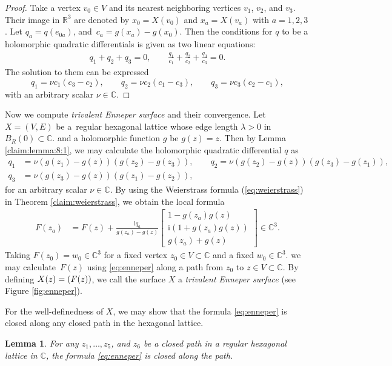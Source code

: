 \documentclass[pdftex]{sigma}
\newcommand{\R}{\mathbb{R}}
\newcommand{\C}{\mathbb{C}}
\newcommand{\ii}{{\mathrm{i}}}
\let\Re\relax
\DeclareMathOperator{\Re}{Re}
\let\Re\relax
\DeclareMathOperator{\Re}{{\mathrm Re}}
\newcommand{\1}{{\bf 1}}
\numberwithin{equation}{section}
\newtheorem{Lemma}[Theorem]{Lemma}
\begin{document}
\begin{proof}
 Take a vertex $v_0 \in V$ and its nearest neighboring vertices $v_1$, $v_2$, and $v_3$.
 Their image in $\R^3$ are denoted by $x_0 =X(v_0)$ and $x_a =X(v_a)$ with $a=1,2,3$.
 Let $q_a= q(e_{0a})$, and~${c_a= g(x_a)-g(x_0)}$.
 Then the conditions for $q$ to be a holomorphic quadratic differentials is given as two linear equations:
 \begin{gather*}
 q_1+q_2+q_3=0,\qquad
 \frac{q_1}{c_1} + \frac{q_2}{c_2} + \frac{q_3}{c_3}=0.
 \end{gather*}
 The solution to them can be expressed
 \[%
 q_1= \nu c_1(c_3-c_2),
 \qquad
 q_2= \nu c_2(c_1-c_3),
 \qquad
 q_3= \nu c_3(c_2-c_1),
 \]
 with an arbitrary scalar $\nu \in \C$.
\end{proof}

Now we compute {\em trivalent Enneper surface} and their convergence.
Let $X = (V, E)$ be a~regular hexagonal lattice whose edge length $\lambda > 0$ in $B_R(0) \subset \C$.
and a holomorphic function $g$ be $g(z) = z$.
Then by Lemma \ref{claim:lemma:8:1}, we may calculate the holomorphic quadratic differential $q$ as
 \begin{align}
 q_1 &= \nu (g(z_1) - g(z))(g(z_2) - g(z_3)), \qquad
 q_2 = \nu (g(z_2) - g(z))(g(z_3) - g(z_1)), \nonumber\\
 q_3 &= \nu (g(z_3) - g(z))(g(z_1) - g(z_2)),  \label{eq:numerical:q}
 \end{align}
for an arbitrary scalar $\nu \in \C$.
By using the Weierstrass formula (\ref{eq:weierstrass}) in Theorem \ref{claim:weierstrass}, we obtain
the local formula
\begin{equation}
 \label{eq:enneper}
 \begin{aligned}
 F(z_a)
 &=
 F(z)
 +
 \frac{\ii q_a}{g(z_a) - g(z)}
 \begin{bmatrix}
 1-g(z_a)g(z)
 \\
 \ii(1+g(z_a)g(z))\\
 g(z_a) + g(z)
 \end{bmatrix}
 \in \C^3.
 \end{aligned}
\end{equation}
Taking $F(z_0) = w_0 \in \C^3$ for a fixed vertex $z_0 \in V \subset \C$ and a fixed $w_0 \in \C^3$.
we may calculate~$F(z)$ using \eqref{eq:enneper} along a path from $z_0$ to $z \in V \subset \C$.
By defining $X(z) = \Re(F(z))$,
we call the surface $X$ a {\em trivalent Enneper surface} (see Figure \ref{fig:enneper}).

For the well-definedness of $X$,
we may show that the formula \eqref{eq:enneper} is closed along any closed path in the hexagonal lattice.
\begin{Lemma}
 For any $z_1, \ldots, z_5$, and $z_6$ be a closed path in a regular hexagonal lattice in $\C$,
 the formula {\rm \eqref{eq:enneper}} is closed along the path.
\end{Lemma}
\end{document}

